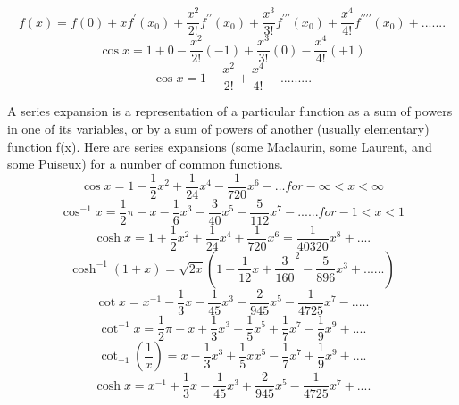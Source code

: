 \begin{displaymath}
f(x) = f(0)+xf^\prime(x_0)+\frac{x^2}{2!}f^{\prime\prime}(x_0)+\frac{x^3}{3!}f^{\prime\prime\prime}(x_0)+\frac{x^4}{4!}
f^{\prime\prime\prime\prime}(x_0)+.......
\end{displaymath}
\begin{displaymath}
\cos x = 1+0-\frac{x^2}{2!}(-1)+\frac{x^3}{3!}(0)-\frac{x^4}{4!}(+1)
\end{displaymath}
\begin{displaymath}
\cos x = 1-\frac{x^2}{2!}+\frac{x^4}{4!}-.........
\end{displaymath}


A series expansion is a representation of a particular function as a sum of powers in one of its variables, or by a sum of powers of another (usually elementary) function  f(x).
Here are series expansions (some Maclaurin, some Laurent, and some Puiseux) for a number of common functions.
\newline
\begin{equation}
\cos x = 1- \frac{1}{2}x^{2}+\frac{1}{24}x^{4}-\frac{1}{720}x^{6} - \ldots for -\infty < x < \infty	
\end{equation}
\begin{equation}
\cos^{-1} x = \frac{1}{2} \pi - x - \frac{1}{6} x^{3} - \frac{3}{40} x^{5} - \frac{5}{112} x^{7} - ......for - 1 < x < 1
\end{equation}
\begin{equation}
\cosh x = 1 + \frac{1}{2} x^2  + \frac{1}{24} x^4 + \frac{1}{720} x^6 = \frac{1}{40320} x^8 + ....
\end{equation}
\begin{equation}
\cosh^{-1} (1+x) = \sqrt{2x} (1 - \frac{1}{12} x + \frac{3}{160} ^2 - \frac{5}{896} x^3 + ......) 
\end{equation}
\begin{equation}
\cot x = x^{-1} - \frac{1}{3} x - \frac{1}{45} x^3 - \frac{2}{945} x^5 - \frac{1}{4725} x^7 - .....
\end{equation}
\begin{equation}
\cot^{-1} x = \frac{1}{2} \pi - x + \frac{1}{3} x^3 - \frac{1}{5} x^5 + \frac{1}{7} x^7 - \frac{1}{9} x^9 + ....	
\end{equation}
\begin{equation}
\cot_{-1}(\frac{1}{x}) = x - \frac{1}{3} x^3 + \frac{1}{5} x x^5 - \frac{1}{7} x^7 + \frac{1}{9} x^9 + ....
\end{equation}
\begin{equation}
\cosh x = x^{-1} + \frac{1}{3} x - \frac{1}{45} x^3 + \frac{2}{945} x^5 - \frac{1}{4725} x^7 + ....
\end{equation}
